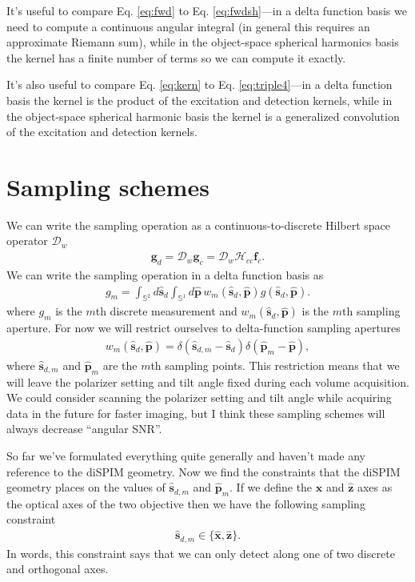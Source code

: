 \documentclass[11pt]{article}
\providecommand{\mb}[1]{\mathbf{#1}}
\providecommand{\mc}[1]{\mathcal{#1}}
\providecommand{\sd}{\mathbf{\hat{s}}_d}
\providecommand{\pp}{\mathbf{\hat{p}}}
\providecommand{\mh}[1]{\mathbf{\hat{#1}}}
\providecommand{\mbb}[1]{\mathbb{#1}}
\begin{document}
It's useful to compare Eq. \eqref{eq:fwd} to Eq. \eqref{eq:fwdsh}---in a delta
function basis we need to compute a continuous angular integral (in general this
requires an approximate Riemann sum), while in the object-space spherical
harmonics basis the kernel has a finite number of terms so we can compute it
exactly.

It's also useful to compare Eq. \eqref{eq:kern} to Eq. \eqref{eq:triple4}---in a
delta function basis the kernel is the product of the excitation and detection
kernels, while in the object-space spherical harmonic basis the kernel is a
generalized convolution of the excitation and detection kernels.

\section{Sampling schemes}
We can write the sampling operation as a continuous-to-discrete Hilbert space
operator $\mc{D}_w$
\begin{align}
  \mb{g}_d = \mc{D}_w\mb{g}_c = \mc{D}_w\mc{H}_{cc}\mb{f}_c. 
\end{align}
We can write the sampling operation in a delta function basis as
\begin{align}
  g_m = \int_{\mbb{S}^2}d\sd\int_{\mbb{S}^1}d\pp\, w_m(\sd,\pp)g(\sd,\pp).
\end{align}
where $g_m$ is the $m$th discrete measurement and $w_m(\sd,\pp)$ is the $m$th
sampling aperture. For now we will restrict ourselves to delta-function sampling
apertures
\begin{align}
  w_m(\sd,\pp) = \delta(\mh{s}_{d,m} - \sd)\delta(\mh{p}_{m} - \pp),
\end{align}
where $\mh{s}_{d,m}$ and $\mh{p}_{m}$ are the $m$th sampling points. This
restriction means that we will leave the polarizer setting and tilt angle fixed
during each volume acquisition. We could consider scanning the polarizer setting
and tilt angle while acquiring data in the future for faster imaging, but I
think these sampling schemes will always decrease ``angular SNR''.

So far we've formulated everything quite generally and haven't made any
reference to the diSPIM geometry. Now we find the constraints that the diSPIM
geometry places on the values of $\mh{s}_{d,m}$ and $\mh{p}_{m}$. If we define
the $\mh{x}$ and $\mh{z}$ axes as the optical axes of the two objective then we
have the following sampling constraint
\begin{align}
\mh{s}_{d,m} \in \{\mh{x}, \mh{z}\}.  \label{eq:first}
\end{align}
In words, this constraint says that we can only detect along one of two discrete
and orthogonal axes.
\end{document}
